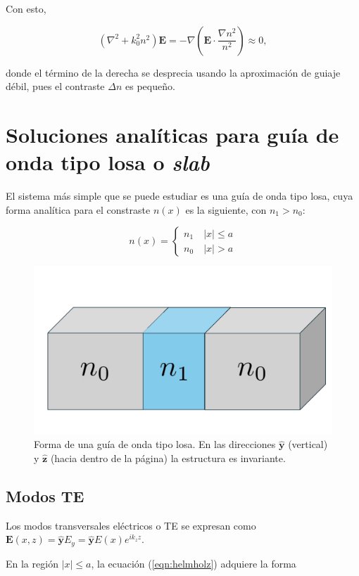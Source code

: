 Con esto, 

\begin{equation}
	(\nabla^2  + k_0^2n^2)\textbf{E} = -\nabla\left(\textbf{E} \cdot \frac{\nabla n^2}{n^2}\right) \approx 0, \label{eqn:helmholz}
\end{equation}

donde el término de la derecha se desprecia usando la aproximación de guiaje débil, pues el contraste $\Delta n$ es pequeño. 

\section{Soluciones analíticas para guía de onda tipo losa o \textit{slab}}

El sistema más simple que se puede estudiar es una guía de onda tipo losa, cuya forma analítica para el constraste $n(x)$ es la siguiente, con $n_1 > n_0$:

\begin{equation*}
	n(x) = \left\{\begin{matrix}
	n_1 \quad |x| \le a
	\\
	n_0 \quad |x| > a
 	\end{matrix}\right.
\end{equation*}

\begin{figure}[H]
	\centering
	\includegraphics[width=0.6\linewidth]{media/slab.pdf}
	\caption[Forma de una guía de onda tipo losa.]{Forma de una guía de onda tipo losa. En las direcciones $\mathbf{\hat{y}}$ (vertical) y $\mathbf{\hat{z}}$ (hacia dentro de la página) la estructura es invariante.}
\end{figure}
\subsection{Modos TE}

Los modos transversales eléctricos o TE se expresan como $\textbf{E}(x,z) =\mathbf{\hat{y}} E_y= \mathbf{\hat{y}} E(x)e^{i k_z z }$.


En la región $|x| \le a$, la ecuación (\ref{eqn:helmholz}) adquiere la forma

